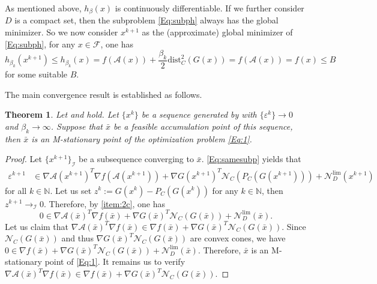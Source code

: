 \documentclass[11pt,a4paper,reqno]{amsart}
\newtheorem{theorem}{Theorem}[section]
\begin{document}
{As mentioned above, $h_{\beta}(x)$ is continuously differentiable. If we further consider $D$ is a compact set, then the subproblem \eqref{Eq:subph} always has the global minimizer. So we now consider $x^{k+1}$ as the (approximate) global minimizer of \eqref{Eq:subph}, for any $x\in \mathcal F$, one has
\begin{equation*}
    h_{\beta_k}(x^{k+1}) \leq h_{\beta_k}(x)=f(\mathcal A(x))+\frac{\beta_k}{2} \text{dist}^2_C(G(x))=f(\mathcal A(x))=f(x) \leq B
\end{equation*}
for some suitable $B$. 

The main convergence result is established as follows.
\begin{theorem}\label{Th:con}
    Let  and  hold. Let $\{x^k\}$ be a sequence generated by  with 
$\{\varepsilon^k\}\to 0$ and $\beta_k \to \infty$. Suppose that $\bar x$ be a feasible accumulation point of this sequence, then $\bar{x}$ is an M-stationary point of the optimization problem \eqref{Eq:1}.
\end{theorem}
\begin{proof}
    Let $\{x^{k+1}\}_{\mathcal I}$ be a subsequence converging to $\bar x$. \eqref{Eq:samesubp} yields that
    \begin{equation*}
    \begin{aligned}
  \varepsilon^{k+1}& \in \nabla \mathcal A(x^{k+1})^T \nabla f(\mathcal A(x^{k+1})) + \nabla G(x^{k+1})^T \mathcal N_C\left(P_C(G(x^{k+1}))\right)
  + \mathcal N_D^{\text{lim}}(x^{k+1})
       \end{aligned}
    \end{equation*}
    for all $k\in \mathbb N$. Let us set $z^k:=G(x^k)-P_C(G(x^k))$ for any $k\in \mathbb N$, then $z^{k+1} \to_{\mathcal I} 0$. Therefore, by  \ref{item:2c}, one has
    \begin{equation}\label{Eq:optimalityQ}
        0\in \nabla \mathcal A(\bar x)^T \nabla f(\bar x)+\nabla G(\bar x)^T \mathcal N_C(G(\bar x))+\mathcal N_D^{\text{lim}}(\bar x).
    \end{equation}
    Let us claim that $\nabla \mathcal A(\bar x)^T \nabla f(\bar x) \in \nabla f(\bar x) + \nabla G(\bar x)^T \mathcal N_C(G(\bar x))$. Since $\mathcal N_C(G(\bar x))$ and thus $\nabla G(\bar x)^T \mathcal N_C(G(\bar x))$ are convex cones, we have
      $0\in \nabla f(\bar x) + \nabla G(\bar x)^T \mathcal N_C(G(\bar x))+ \mathcal N_D^{\text{lim}}(\bar x)$.
Therefore, $\bar x$ is an M-stationary point of \eqref{Eq:1}. It remains us to verify $\nabla \mathcal A(\bar x)^T \nabla f(\bar x) \in \nabla f(\bar x) + \nabla G(\bar x)^T \mathcal N_C(G(\bar x))$. 


\end{proof}}
\end{document}
